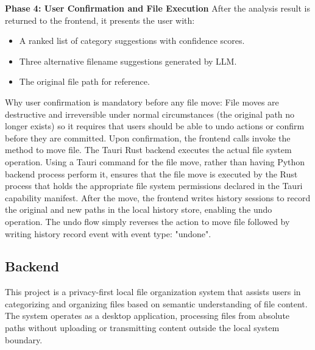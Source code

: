 \documentclass[12pt,oneside,openright,a4paper]{cpe-english-project}
\begin{document}
\textbf{Phase 4: User Confirmation and File Execution}
After the analysis result is returned to the frontend, it presents the user with:
\begin{itemize}
\item A ranked list of category suggestions with confidence scores.
\item Three alternative filename suggestions generated by LLM.
\item The original file path for reference.
\end{itemize}
Why user confirmation is mandatory before any file move:
File moves are destructive and irreversible under normal circumstances (the original path no longer exists) so it requires that users should be able to undo actions or confirm before they are committed.
Upon confirmation, the frontend calls invoke the method to move file. The Tauri Rust backend executes the actual file system operation. Using a Tauri command for the file move, rather than having Python backend process perform it, ensures that the file move is executed by the Rust process that holds the appropriate file system permissions declared in the Tauri capability manifest.
After the move, the frontend writes history sessions to record the original and new paths in the local history store, enabling the undo operation. The undo flow simply reverses the action to move file followed by writing history record event with event type: "undone".



\subsection{Backend}
This project is a privacy-first local file organization system that assists users in categorizing and organizing files based on semantic understanding of file content. The system operates as a desktop application, processing files from absolute paths without uploading or transmitting content outside the local system boundary.
\end{document}
